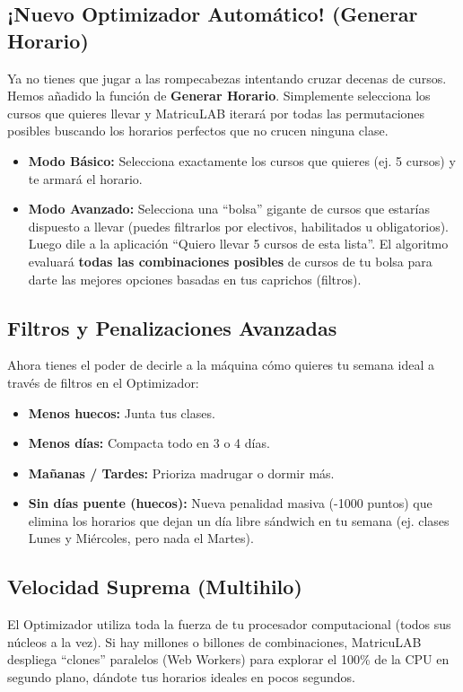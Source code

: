 \documentclass[12pt,a4paper]{article}
\begin{document}
\subsection{¡Nuevo Optimizador Automático! (Generar Horario)}
Ya no tienes que jugar a las rompecabezas intentando cruzar decenas de cursos. Hemos añadido la función de \textbf{Generar Horario}. Simplemente selecciona los cursos que quieres llevar y MatricuLAB iterará por todas las permutaciones posibles buscando los horarios perfectos que no crucen ninguna clase.
\begin{itemize}[label=\textcolor{blue}{\textbullet}]
    \item \textbf{Modo Básico:} Selecciona exactamente los cursos que quieres (ej. 5 cursos) y te armará el horario.
    \item \textbf{Modo Avanzado:} Selecciona una ``bolsa'' gigante de cursos que estarías dispuesto a llevar (puedes filtrarlos por electivos, habilitados u obligatorios). Luego dile a la aplicación ``Quiero llevar 5 cursos de esta lista''. El algoritmo evaluará \textbf{todas las combinaciones posibles} de cursos de tu bolsa para darte las mejores opciones basadas en tus caprichos (filtros).
\end{itemize}

\subsection{Filtros y Penalizaciones Avanzadas}
Ahora tienes el poder de decirle a la máquina cómo quieres tu semana ideal a través de filtros en el Optimizador:
\begin{itemize}[label=\textcolor{blue}{\textbullet}]
    \item \textbf{Menos huecos:} Junta tus clases.
    \item \textbf{Menos días:} Compacta todo en 3 o 4 días.
    \item \textbf{Mañanas / Tardes:} Prioriza madrugar o dormir más.
    \item \textbf{Sin días puente (huecos):} Nueva penalidad masiva (-1000 puntos) que elimina los horarios que dejan un día libre sándwich en tu semana (ej. clases Lunes y Miércoles, pero nada el Martes).
\end{itemize}

\subsection{Velocidad Suprema (Multihilo)}
El Optimizador utiliza toda la fuerza de tu procesador computacional (todos sus núcleos a la vez). Si hay millones o billones de combinaciones, MatricuLAB despliega ``clones'' paralelos (Web Workers) para explorar el 100\% de la CPU en segundo plano, dándote tus horarios ideales en pocos segundos.
\end{document}

